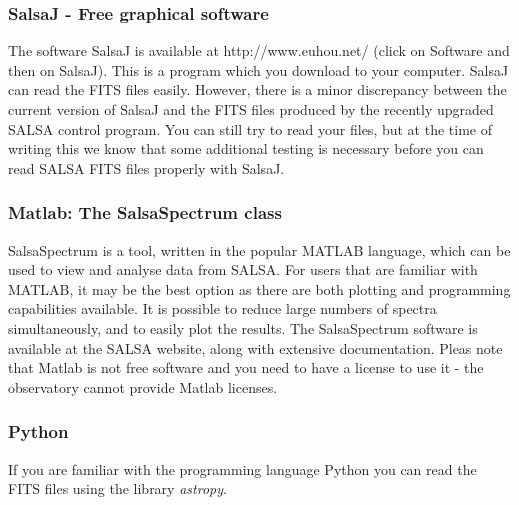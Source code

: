 \subsubsection{SalsaJ - Free graphical software}
The software SalsaJ is available at http://www.euhou.net/ (click on Software
and then on SalsaJ).  This is a program which you download to your computer.
SalsaJ can read the FITS files easily. However, there is a minor discrepancy
between the current version of SalsaJ and the FITS files produced by the
recently upgraded SALSA control program. You can still try to read your files,
but at the time of writing this we know that some additional testing is
necessary before you can read SALSA FITS files properly with SalsaJ.

\subsubsection{Matlab: The SalsaSpectrum class}
SalsaSpectrum is a tool, written in the popular MATLAB
language, which can be used to view and analyse data from SALSA. For users that
are familiar with MATLAB, it may be the best option as there are both plotting
and programming capabilities available. It is possible to reduce large numbers
of spectra simultaneously, and to easily plot the results. The SalsaSpectrum
software is available at the SALSA website, along with extensive documentation.
Pleas note that Matlab is not free software and you need to have a license to
use it - the observatory cannot provide Matlab licenses.  

\subsubsection{Python}
If you are familiar with the programming language Python you can read the FITS files
using the library \emph{astropy}.
